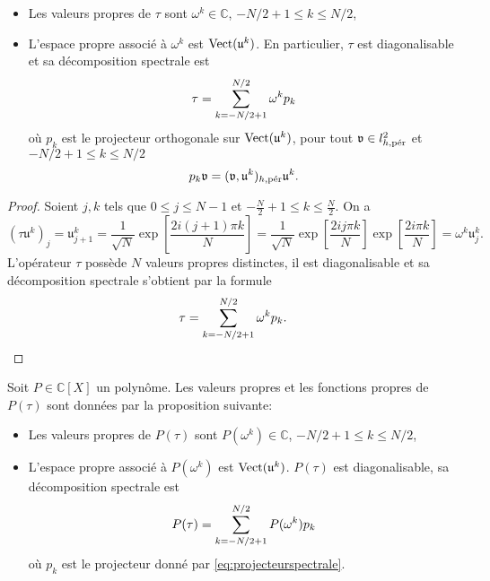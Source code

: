 \begin{proposition}
\begin{itemize}
\item Les valeurs propres de $\tau$ sont $\omega^k \in \mathbb{C}$, $-N/2 + 1 \leq k \leq N/2$,

\item L'espace propre associé à $\omega^k$ est $\Vect (\mathfrak{u}^k)$. En particulier, $\tau$ est diagonalisable et sa décomposition spectrale est
\begin{equation}
\tau = \gsum_{k = -N/2+1}^{N/2} \omega^k p_k
\end{equation}
où $p_k$ est le projecteur orthogonale sur $\Vect (\mathfrak{u}^k)$, pour tout $\mathfrak{v} \in l^2_{h,\per}$ et $-N/2+1 \leq k \leq N/2$
\begin{equation}
p_k \mathfrak{v} = (\mathfrak{v},\mathfrak{u}^k)_{h,\per}\mathfrak{u}^k.
\label{eq:projecteurspectrale}
\end{equation}
\end{itemize}
\label{prop:eigenvaluevector_tau}
\end{proposition}

\begin{proof}
Soient $j, k$ tels que $0 \leq j \leq N-1$ et $-\frac{N}{2}+1 \leq k \leq \frac{N}{2}$. On a
\begin{equation}
(\tau \mathfrak{u}^k)_j = \mathfrak{u}^k_{j+1}= \dfrac{1}{\sqrt{N}}\exp \left[ \dfrac{2 i (j+1)  \pi k}{N} \right] = \dfrac{1}{\sqrt{N}} \exp \left[ \dfrac{2 i j \pi k}{N} \right] \exp \left[ \dfrac{2 i \pi k}{N} \right] = \omega^k \mathfrak{u}_j^k.
\end{equation}
L'opérateur $\tau$ possède $N$ valeurs propres distinctes, il est diagonalisable et sa décomposition spectrale s'obtient par la formule
\begin{equation*}
\tau = \gsum_{k = -N/2+1}^{N/2} \omega^k p_k.
\end{equation*}
\end{proof}

Soit $P \in \mathbb{C}[X]$ un polynôme. Les valeurs propres et les fonctions propres de $P(\tau)$ sont données par la proposition suivante:
\begin{proposition}
\begin{itemize}
\item Les valeurs propres de $P(\tau)$ sont $P(\omega^k) \in \mathbb{C}$, $-N/2 + 1 \leq k \leq N/2$,

\item L'espace propre associé à $P(\omega^k)$ est $\Vect (\mathfrak{u}^k)$. $P(\tau)$ est diagonalisable, sa décomposition spectrale est
\begin{equation}
P(\tau) = \gsum_{k=-N/2+1}^{N/2} P(\omega^k) p_k
\label{eq:formule_diagPtau}
\end{equation}
où $p_k$ est le projecteur donné par \eqref{eq:projecteurspectrale}.
\end{itemize}
\label{prop:eigen_Ptau}
\end{proposition}

